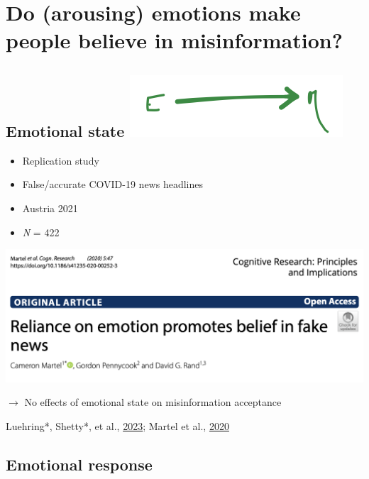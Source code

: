 \documentclass[
  letterpaper,
  DIV=11,
  numbers=noendperiod]{scrartcl}
\begin{document}
\hypertarget{do-arousing-emotions-make-people-believe-in-misinformation}{%
\section{Do (arousing) emotions make people believe in
misinformation?}\label{do-arousing-emotions-make-people-believe-in-misinformation}}

\hypertarget{emotional-state}{%
\subsection[Emotional state ]{\texorpdfstring{Emotional state
\protect\includegraphics[width=3.125in,height=\textheight]{images/simple-relationship.png}}{Emotional state }}\label{emotional-state}}

\begin{itemize}
\item
  Replication study
\item
  False/accurate COVID-19 news headlines
\item
  Austria 2021
\item
  \emph{N} = 422
\end{itemize}

\includegraphics[width=10.41667in,height=\textheight]{images/Martel.png}

\(\rightarrow\) No effects of emotional state on misinformation
acceptance

Luehring*, Shetty*, et al., \href{https://psyarxiv.com/udqms/}{2023};
Martel et al.,
\href{https://link.springer.com/article/10.1186/s41235-020-00252-3}{2020}

\hypertarget{emotional-response}{%
\subsection{Emotional response}\label{emotional-response}}
\end{document}
